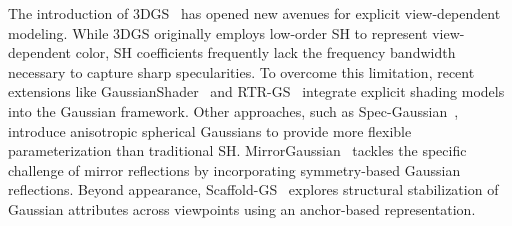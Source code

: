 \documentclass[runningheads]{llncs}
\begin{document}
The introduction of 3DGS~\cite{kerbl20233dgs} has opened new avenues for explicit view-dependent modeling. While 3DGS originally employs low-order SH to represent view-dependent color, SH coefficients frequently lack the frequency bandwidth necessary to capture sharp specularities. To overcome this limitation, recent extensions like GaussianShader~\cite{jiang2024gaussianshader} and RTR-GS~\cite{zhou2025rtr-gs} integrate explicit shading models into the Gaussian framework. Other approaches, such as Spec-Gaussian~\cite{yang2024spec-gaussian}, introduce anisotropic spherical Gaussians to provide more flexible parameterization than traditional SH. MirrorGaussian~\cite{liu2024mirrorgaussian} tackles the specific challenge of mirror reflections by incorporating symmetry-based Gaussian reflections. Beyond appearance, Scaffold-GS~\cite{lu2024scaffold-gs} explores structural stabilization of Gaussian attributes across viewpoints using an anchor-based representation.
\end{document}
